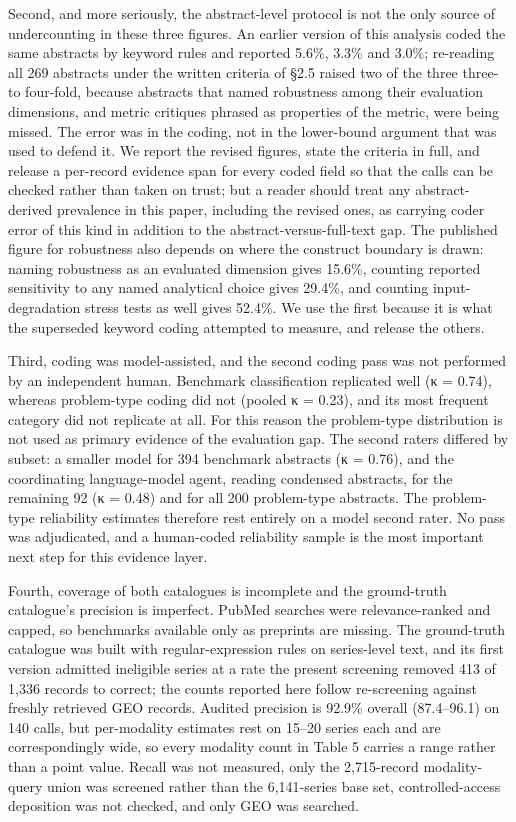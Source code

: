 \documentclass[11pt]{article}
\begin{document}
Second, and more seriously, the abstract-level protocol is not the only
source of undercounting in these three figures. An earlier version of
this analysis coded the same abstracts by keyword rules and reported
5.6\%, 3.3\% and 3.0\%; re-reading all 269 abstracts under the written
criteria of §2.5 raised two of the three three- to four-fold, because
abstracts that named robustness among their evaluation dimensions, and
metric critiques phrased as properties of the metric, were being missed.
The error was in the coding, not in the lower-bound argument that was
used to defend it. We report the revised figures, state the criteria in
full, and release a per-record evidence span for every coded field so
that the calls can be checked rather than taken on trust; but a reader
should treat any abstract-derived prevalence in this paper, including
the revised ones, as carrying coder error of this kind in addition to
the abstract-versus-full-text gap. The published figure for robustness
also depends on where the construct boundary is drawn: naming robustness
as an evaluated dimension gives 15.6\%, counting reported sensitivity to
any named analytical choice gives 29.4\%, and counting input-degradation
stress tests as well gives 52.4\%. We use the first because it is what
the superseded keyword coding attempted to measure, and release the
others.

Third, coding was model-assisted, and the second coding pass was not
performed by an independent human. Benchmark classification replicated
well (κ = 0.74), whereas problem-type coding did not (pooled κ = 0.23),
and its most frequent category did not replicate at all. For this reason
the problem-type distribution is not used as primary evidence of the
evaluation gap. The second raters differed by subset: a smaller model
for 394 benchmark abstracts (κ = 0.76), and the coordinating
language-model agent, reading condensed abstracts, for the remaining 92
(κ = 0.48) and for all 200 problem-type abstracts. The problem-type
reliability estimates therefore rest entirely on a model second rater.
No pass was adjudicated, and a human-coded reliability sample is the
most important next step for this evidence layer.

Fourth, coverage of both catalogues is incomplete and the ground-truth
catalogue's precision is imperfect. PubMed searches were
relevance-ranked and capped, so benchmarks available only as preprints
are missing. The ground-truth catalogue was built with
regular-expression rules on series-level text, and its first version
admitted ineligible series at a rate the present screening removed 413
of 1,336 records to correct; the counts reported here follow
re-screening against freshly retrieved GEO records. Audited precision is
92.9\% overall (87.4--96.1) on 140 calls, but per-modality estimates
rest on 15--20 series each and are correspondingly wide, so every
modality count in Table 5 carries a range rather than a point value.
Recall was not measured, only the 2,715-record modality-query union was
screened rather than the 6,141-series base set, controlled-access
deposition was not checked, and only GEO was searched.
\end{document}
